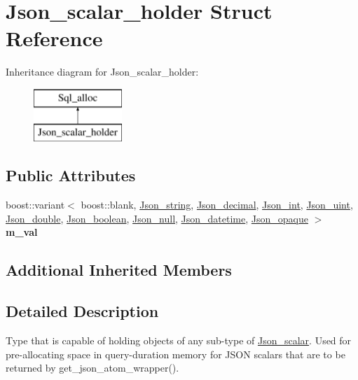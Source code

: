 \hypertarget{structJson__scalar__holder}{}\section{Json\+\_\+scalar\+\_\+holder Struct Reference}
\label{structJson__scalar__holder}
Inheritance diagram for Json\+\_\+scalar\+\_\+holder\+:\begin{figure}[H]
\begin{center}
\leavevmode
\includegraphics[height=2.000000cm]{structJson__scalar__holder}
\end{center}
\end{figure}
\subsection*{Public Attributes}
\begin{DoxyCompactItemize}
\item 
\mbox{\label{structJson__scalar__holder_a401749878e6272d62e7447780d8fcad6}} 
boost\+::variant$<$ boost\+::blank, \mbox{\hyperlink{classJson__string}{Json\+\_\+string}}, \mbox{\hyperlink{classJson__decimal}{Json\+\_\+decimal}}, \mbox{\hyperlink{classJson__int}{Json\+\_\+int}}, \mbox{\hyperlink{classJson__uint}{Json\+\_\+uint}}, \mbox{\hyperlink{classJson__double}{Json\+\_\+double}}, \mbox{\hyperlink{classJson__boolean}{Json\+\_\+boolean}}, \mbox{\hyperlink{classJson__null}{Json\+\_\+null}}, \mbox{\hyperlink{classJson__datetime}{Json\+\_\+datetime}}, \mbox{\hyperlink{classJson__opaque}{Json\+\_\+opaque}} $>$ {\bfseries m\+\_\+val}
\end{DoxyCompactItemize}
\subsection*{Additional Inherited Members}


\subsection{Detailed Description}
Type that is capable of holding objects of any sub-\/type of \mbox{\hyperlink{classJson__scalar}{Json\+\_\+scalar}}. Used for pre-\/allocating space in query-\/duration memory for J\+S\+ON scalars that are to be returned by get\+\_\+json\+\_\+atom\+\_\+wrapper().

